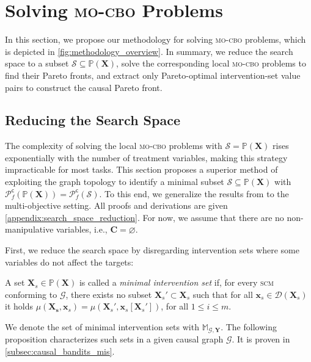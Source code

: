\section{Solving \textsc{mo-cbo} Problems}\label{sec:mo_cbo_solve}

In this section, we propose our methodology for solving \textsc{mo-cbo} problems, which is depicted in \cref{fig:methodology_overview}. In summary, we reduce the search space to a subset $\mathcal{S} \subseteq \mathbb{P}(\mathbf{X})$, solve the corresponding local \textsc{mo-cbo} problems to find their Pareto fronts, and extract only Pareto-optimal intervention-set value pairs to construct the causal Pareto front.

\subsection{Reducing the Search Space}\label{subsec:search_space_reduction}
The complexity of solving the local \textsc{mo-cbo} problems with $\mathcal{S} = \mathbb{P}(\mathbf{X})$ rises exponentially with the number of treatment variables, making this strategy impracticable for most tasks. This section proposes a superior method of exploiting the graph topology to identify a minimal subset $\mathcal{S} \subseteq \mathbb{P}(\mathbf{X})$ with $\mathcal{P}_f^{\textsf{c}}(\mathbb{P}(\mathbf{X})) = \mathcal{P}_f^{\textsf{c}}(\mathcal{S})$.
To this end, we generalize the results from \citet{NEURIPS2018_c0a271bc} to the multi-objective setting. All proofs and derivations are given \cref{appendix:search_space_reduction}. For now, we assume that there are no non-manipulative variables, i.e., $\mathbf{C} = \varnothing$.

First, we reduce the search space by disregarding intervention sets where some variables do not affect the targets:

\begin{definition} \label{def:causal_bandits.mis}
    A set $\mathbf{X}_s \in \mathbb{P}(\mathbf{X})$ is called a \textit{minimal intervention set} if, for every \textsc{scm} conforming to $\mathcal{G}$, there exists no subset $\mathbf{X}_s' \subset \mathbf{X}_s$ such that for all $\mathbf{x}_s \in \mathcal{D}(\mathbf{X}_s)$ it holds $\mu(\mathbf{X_s},\mathbf{x}_s) = \mu(\mathbf{X}_s',\mathbf{x}_s[\mathbf{X}_s'])$, for all $1 \leq i \leq m$.
\end{definition}

We denote the set of minimal intervention sets with $\mathbb{M}_{\mathcal{G},\mathbf{Y}}$. The following proposition characterizes such sets in a given causal graph $\mathcal{G}$. It is proven in \cref{subsec:causal_bandits_mis}.

